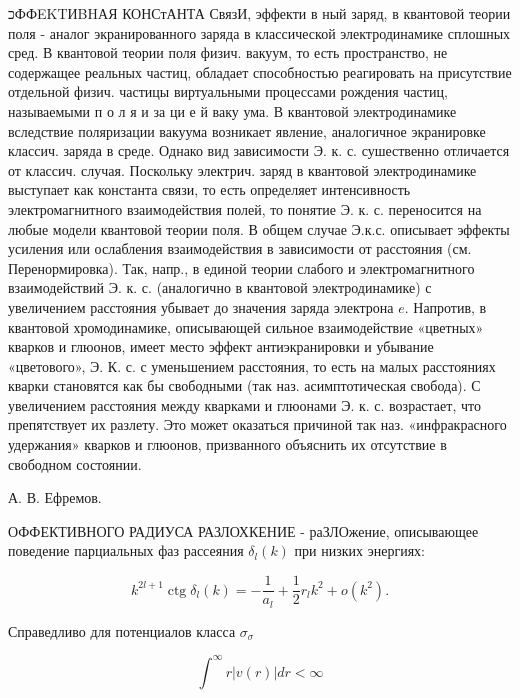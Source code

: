 \documentclass[10pt]{article}
\begin{document}
כФФEKTИBHАЯ КОНСтАНТА СвязИ, эффекти в ный заряд, в квантовой теории поля - аналог экранированного заряда в классической электродинамике сплошных сред. В квантовой теории поля физич. вакуум, то есть пространство, не содержащее реальных частиц, обладает способностью реагировать на присутствие отдельной физич. частицы виртуальными процессами рождения частиц, называемыми п о л я и за ци е й ваку ума. В квантовой электродинамике вследствие поляризации вакуума возникает явление, аналогичное экранировке классич. заряда в среде. Однако вид зависимости Э. к. с. сушественно отличается от классич. случая. Поскольку электрич. заряд в квантовой электродинамике выступает как константа связи, то есть определяет интенсивность электромагнитного взаимодействия полей, то понятие Э. к. с. переносится на любые модели квантовой теории поля. В общем случае Э.к.с. описывает эффекты усиления или ослабления взаимодействия в зависимости от расстояния (см. Перенормировка). Так, напр., в единой теории слабого и электромагнитного взаимодействий Э. к. с. (аналогично в квантовой электродинамике) с увеличением расстояния убывает до значения заряда электрона $e$. Напротив, в квантовой хромодинамике, описывающей сильное взаимодействие «цветных» кварков и глюонов, имеет место эффект антиэкранировки и убывание «цветового», Э. К. с. с уменьшением расстояния, то есть на малых расстояниях кварки становятся как бы свободными (так наз. асимптотическая свобода). С увеличением расстояния между кварками и глюонами Э. к. с. возрастает, что препятствует их разлету. Это может оказаться причиной так наз. «инфракрасного удержания» кварков и глюонов, призванного объяснить их отсутствие в свободном состоянии.



А. В. Ефремов.



ОФФЕКТИВНОГО РАДИУСА РАЗЛОХКЕНИЕ - раЗЛОжение, описывающее поведение парциальных фаз рассеяния $\delta_{l}(k)$ при низких энергиях:



\[

k^{2 l+1} \operatorname{ctg} \delta_{l}(k)=-\frac{1}{a_{l}}+\frac{1}{2} r_{l} k^{2}+o\left(k^{2}\right) .

\]



Справедливо для потенциалов класса $\sigma_{\sigma}$



\[

\int^{\infty} r|v(r)| d r<\infty

\]
\end{document}
